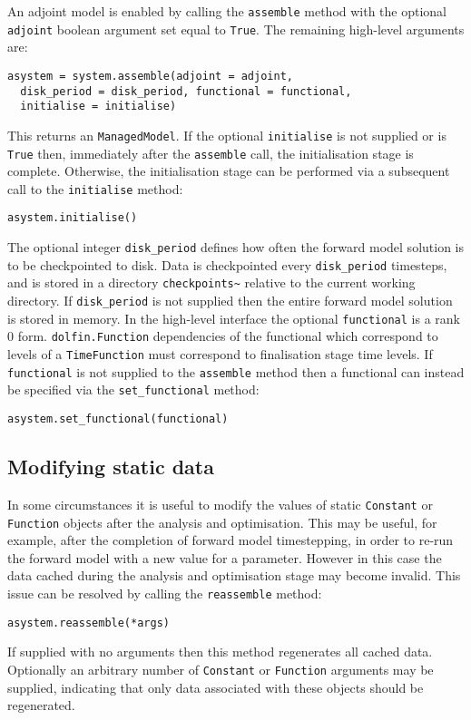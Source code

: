 \documentclass[a4paper]{book}
\begin{document}
An adjoint model is enabled by calling the \verb+assemble+ method with the
optional \verb+adjoint+ boolean argument set equal to \verb+True+. The remaining
high-level arguments are:
\begin{lstlisting}
asystem = system.assemble(adjoint = adjoint,
  disk_period = disk_period, functional = functional,
  initialise = initialise)
\end{lstlisting}
This returns an \verb+ManagedModel+. If the optional \verb+initialise+ is not
supplied or is \verb+True+ then, immediately after the \verb+assemble+ call, the
initialisation stage is complete. Otherwise, the initialisation stage can be
performed via a subsequent call to the \verb+initialise+ method:
\begin{lstlisting}
asystem.initialise()
\end{lstlisting}
The optional integer \verb+disk_period+ defines how often the forward model
solution is to be checkpointed to disk. Data is checkpointed every
\verb+disk_period+ timesteps, and is stored in a directory \verb+checkpoints~+
relative to the current working directory. If \verb+disk_period+ is not supplied
then the entire forward model solution is stored in memory. In the high-level
interface the optional \verb+functional+ is a rank 0 form.
\verb+dolfin.Function+ dependencies of the functional which correspond to levels
of a \verb+TimeFunction+ must correspond to finalisation stage time levels. If
\verb+functional+ is not supplied to the \verb+assemble+ method then a
functional can instead be specified via the \verb+set_functional+ method:
\begin{lstlisting}
asystem.set_functional(functional)
\end{lstlisting}

\subsection{Modifying static data}\label{sect:reassembly}

In some circumstances it is useful to modify the values of static \verb+Constant+
or \verb+Function+ objects after the analysis and optimisation. This may be
useful, for example, after the completion of forward model timestepping, in
order to re-run the forward model with a new value for a parameter. However in
this case the data cached during the analysis and optimisation stage may become
invalid. This issue can be resolved by calling the \verb+reassemble+ method:
\begin{lstlisting}
asystem.reassemble(*args)
\end{lstlisting}
If supplied with no arguments then this method regenerates all cached data.
Optionally an arbitrary number of \verb+Constant+ or \verb+Function+ arguments
may be supplied, indicating that only data associated with these objects should
be regenerated.
\end{document}

